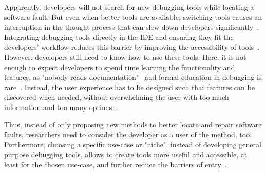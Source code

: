 Apparently, developers will not search for new debugging tools while locating a software fault.
But even when better tools are available, switching tools causes an interruption in the thought process that can slow down developers significantly~\cite{altmann14:momentary_interruptions_can_derail}.
Integrating debugging tools directly in the IDE and ensuring they fit the developers' workflow reduces this barrier by improving the accessibility of tools~\cite{wasserman90:tool_integration_in_software, stenning87:on_the_role}.
However, developers still need to know how to use these tools.
Here, it is not enough to expect developers to spend time learning the functionality and features, as "nobody reads documentation"~\cite{rettig91:nobody_reads_documentation} and formal education in debugging is rare~\cite{perscheid17:studying_the_advancement, ballou08:improving_software_quality}.
Instead, the user experience has to be designed such that features can be discovered when needed, without overwhelming the user with too much information and too many options~\cite{brockmann90:the_why_where}.

Thus, instead of only proposing new methods to better locate and repair software faults, 
researchers need to consider the developer as a user of the method, too.
Furthermore, choosing a specific use-case or "niche", instead of developing general purpose debugging tools,
allows to create tools more useful and accessible, at least for the chosen use-case, and further reduce the barriers of entry~\cite{wotawa17:panel_discussion}.



